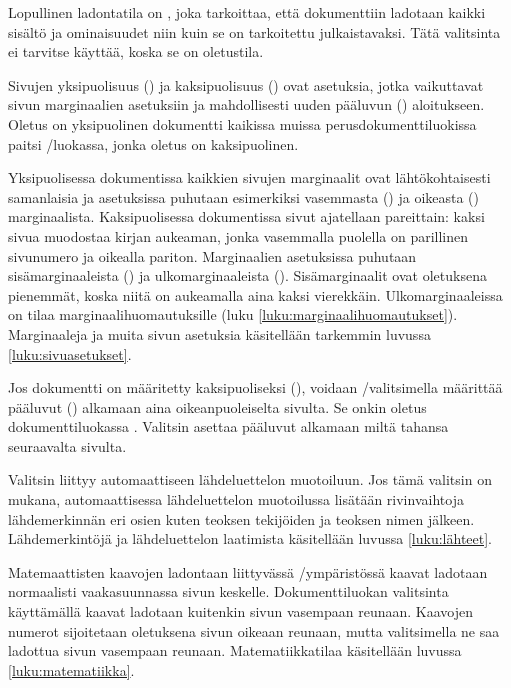 Lopullinen ladontatila on ,  joka
tarkoittaa, että dokumenttiin ladotaan kaikki sisältö ja ominaisuudet
niin kuin se on tarkoitettu julkaistavaksi. Tätä valitsinta ei tarvitse
käyttää, koska se on oletustila.

Sivujen yksipuolisuus  
() ja kaksipuolisuus () ovat
asetuksia, jotka vaikuttavat sivun marginaalien asetuksiin ja
mahdollisesti uuden pääluvun () aloitukseen. Oletus
on yksipuolinen dokumentti kaikissa muissa perusdokumenttiluokissa
paitsi \-/luokassa, jonka oletus on kaksipuolinen.

Yksipuolisessa dokumentissa kaikkien sivujen marginaalit ovat
lähtökohtaisesti samanlaisia ja asetuksissa puhutaan esimerkiksi
vasemmasta () ja oikeasta ()
marginaalista. Kaksipuolisessa dokumentissa sivut ajatellaan pareittain:
kaksi sivua muodostaa kirjan aukeaman, jonka vasemmalla puolella on
parillinen sivunumero ja oikealla pariton. Marginaalien asetuksissa
puhutaan sisämarginaaleista () ja ulkomarginaaleista
(). Sisämarginaalit ovat oletuksena pienemmät, koska
niitä on aukeamalla aina kaksi vierekkäin. Ulkomarginaaleissa on tilaa
marginaalihuomautuksille (luku \ref{luku:marginaalihuomautukset}).
Marginaaleja ja muita sivun asetuksia käsitellään tarkemmin luvussa
\ref{luku:sivuasetukset}.

Jos dokumentti on määritetty kaksipuoliseksi (),
voidaan \-/valitsimella 
määrittää pääluvut () alkamaan aina
oikeanpuoleiselta sivulta. Se onkin oletus dokumenttiluokassa
. Valitsin   asettaa
pääluvut alkamaan miltä tahansa seuraavalta sivulta.

Valitsin   liittyy automaattiseen
lähdeluettelon muotoiluun. Jos tämä valitsin on mukana, automaattisessa
lähdeluettelon muotoilussa lisätään rivinvaihtoja lähdemerkinnän eri
osien kuten teoksen tekijöiden ja teoksen nimen jälkeen. Lähdemerkintöjä
ja lähdeluettelon laatimista käsitellään luvussa \ref{luku:lähteet}.

Matemaattisten kaavojen ladontaan liittyvässä
\-/ympäristössä kaavat ladotaan normaalisti
vaakasuunnassa sivun keskelle. Dokumenttiluokan valitsinta 
 käyttämällä kaavat ladotaan kuitenkin sivun
vasempaan reunaan. Kaavojen numerot sijoitetaan oletuksena sivun oikeaan
reunaan, mutta valitsimella   ne saa
ladottua sivun vasempaan reunaan. Matematiikkatilaa käsitellään luvussa
\ref{luku:matematiikka}.

